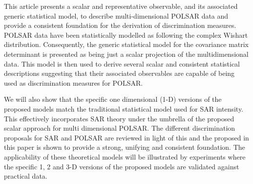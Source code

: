 \documentclass[]{tRSL2e}
\begin{document}
This article presents a scalar and representative observable, and its associated generic statistical model, to describe multi-dimensional POLSAR data and provide a consistent foundation for the derivation of discrimination measures.
POLSAR data have been statistically modelled as following the complex Wishart distribution.
Consequently, the generic statistical model for the covariance matrix determinant is presented as being just a scalar projection of the multidimensional data.
This model is then used to derive several scalar and consistent statistical descriptions suggesting that their associated observables are capable of being used as discrimination measures for POLSAR.
%

We will also show that %
  the specific one dimensional (1-D) versions of the proposed  models 
  match %
  the traditional statistical model used for SAR intensity.
This effectively incorporates SAR theory under the umbrella of the proposed scalar approach for multi dimensional POLSAR.
The different discrimination proposals for SAR and POLSAR are reviewed in light of this and the  proposed in this paper is shown to provide a strong, unifying and consistent foundation. %
The applicability of these theoretical models will be illustrated by experiments where the specific 1, 2 and 3-D versions of the proposed models are validated against practical data. 
\end{document}
